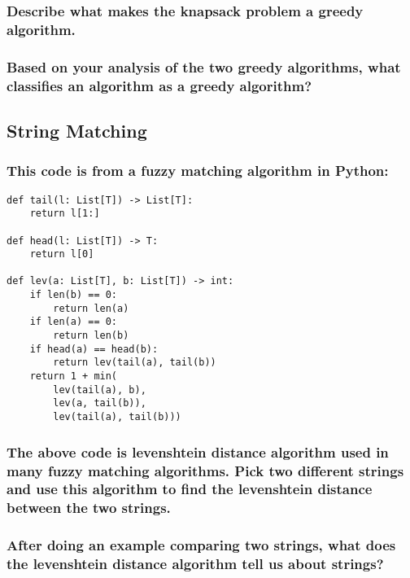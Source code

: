 \documentclass{article}
\begin{document}
\vspace{24pt}

\subsubsection{Describe what makes the knapsack problem a greedy algorithm.}

\vspace{144pt}

\subsubsection{Based on your analysis of the two greedy algorithms, what classifies an algorithm as a greedy algorithm?}

\pagebreak{}

\begin{Large}
\subsection{\textbf{String Matching}}
\end{Large}

\subsubsection{This code is from a fuzzy matching algorithm in Python:}

\begin{lstlisting}
def tail(l: List[T]) -> List[T]:
    return l[1:]

def head(l: List[T]) -> T:
    return l[0]

def lev(a: List[T], b: List[T]) -> int:
    if len(b) == 0:
        return len(a)
    if len(a) == 0:
        return len(b)
    if head(a) == head(b):
        return lev(tail(a), tail(b))
    return 1 + min(
        lev(tail(a), b),
        lev(a, tail(b)),
        lev(tail(a), tail(b)))
\end{lstlisting}

\subsubsection{The above code is levenshtein distance algorithm used in many fuzzy matching algorithms. Pick two different strings and use this algorithm to find the levenshtein distance between the two strings. }

\vspace{72pt}

\subsubsection{After doing an example comparing two strings, what does the levenshtein distance algorithm tell us about strings?}

\pagebreak{}
\end{document}
